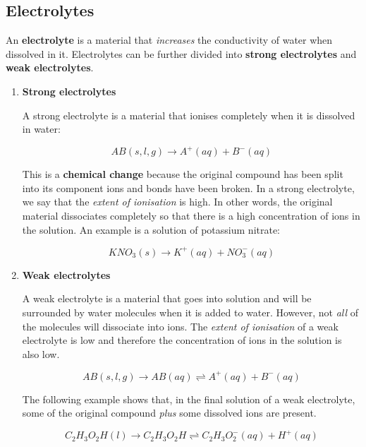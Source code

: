 
\subsection{Electrolytes}

An \textbf{electrolyte} is a material that \textit{increases} the conductivity of water when dissolved in it. Electrolytes can be further divided into \textbf{strong electrolytes} and \textbf{weak electrolytes}.


\begin{enumerate}
\item{\textbf{Strong electrolytes}

A strong electrolyte is a material that ionises completely when it is dissolved in water:

\begin{equation*}
AB (s,l,g) \rightarrow A^{+} (aq) + B^{-} (aq)
\end{equation*}

This is a \textbf{chemical change} because the original compound has been split into its component ions and bonds have been broken. In a strong electrolyte, we say that the \textit{extent of ionisation} is high. In other words, the original material dissociates completely so that there is a high concentration of ions in the solution. An example is a solution of potassium nitrate:

\begin{equation*}
KNO_{3} (s) \rightarrow K^{+} (aq) + NO_{3}^{-} (aq)
\end{equation*}
}

\item{\textbf{Weak electrolytes}

A weak electrolyte is a material that goes into solution and will be surrounded by water molecules when it is added to water. However, not \textit{all} of the molecules will dissociate into ions. The \textit{extent of ionisation} of a weak electrolyte is low and therefore the concentration of ions in the solution is also low.

\begin{equation*}
AB (s,l,g) \rightarrow AB (aq) \rightleftharpoons A^{+} (aq) + B^{-} (aq)
\end{equation*}

The following example shows that, in the final solution of a weak electrolyte, some of the original compound \textit{plus} some dissolved ions are present.

\begin{equation*}
C_{2}H_{3}O_{2}H (l) \rightarrow C_{2}H_{3}O_{2}H \rightleftharpoons C_{2}H_{3}O_{2}^{-} (aq) + H^{+} (aq)
\end{equation*}
}
\end{enumerate}

